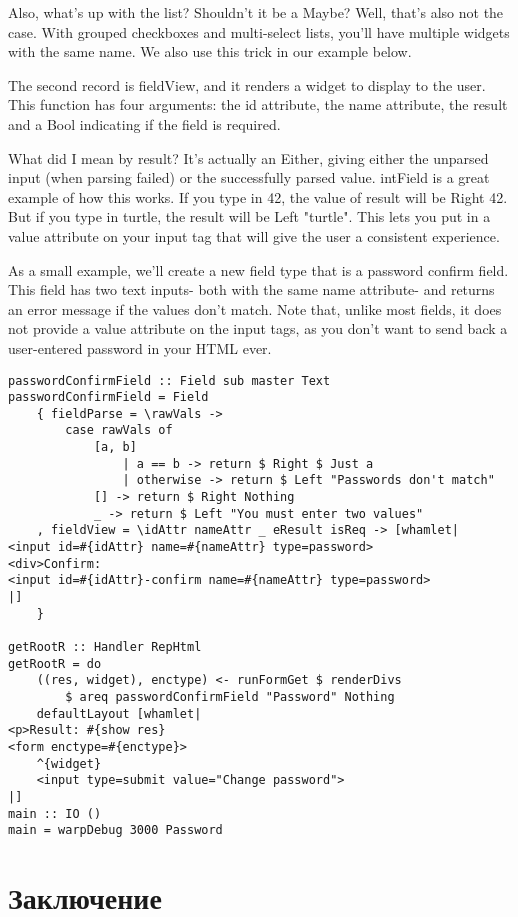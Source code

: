 Also, what's up with the list? Shouldn't it be a Maybe? Well, that's also not the case.
With grouped checkboxes and multi-select lists, you'll have multiple widgets with the same
name. We also use this trick in our example below.

The second record is fieldView, and it renders a widget to display to the user. This
function has four arguments: the id attribute, the name attribute, the result and a Bool
indicating if the field is required.

What did I mean by result? It's actually an Either, giving either the unparsed input (when
parsing failed) or the successfully parsed value. intField is a great example of how this
works. If you type in 42, the value of result will be Right 42. But if you type in turtle,
the result will be Left "turtle". This lets you put in a value attribute on your input tag
that will give the user a consistent experience.

As a small example, we'll create a new field type that is a password confirm field. This
field has two text inputs- both with the same name attribute- and returns an error message
if the values don't match. Note that, unlike most fields, it does not provide a value
attribute on the input tags, as you don't want to send back a user-entered password in
your HTML ever.

\begin{lstlisting}
passwordConfirmField :: Field sub master Text
passwordConfirmField = Field
    { fieldParse = \rawVals ->
        case rawVals of
            [a, b]
                | a == b -> return $ Right $ Just a
                | otherwise -> return $ Left "Passwords don't match"
            [] -> return $ Right Nothing
            _ -> return $ Left "You must enter two values"
    , fieldView = \idAttr nameAttr _ eResult isReq -> [whamlet|
<input id=#{idAttr} name=#{nameAttr} type=password>
<div>Confirm:
<input id=#{idAttr}-confirm name=#{nameAttr} type=password>
|]
    }

getRootR :: Handler RepHtml
getRootR = do
    ((res, widget), enctype) <- runFormGet $ renderDivs
        $ areq passwordConfirmField "Password" Nothing
    defaultLayout [whamlet|
<p>Result: #{show res}
<form enctype=#{enctype}>
    ^{widget}
    <input type=submit value="Change password">
|]
main :: IO ()
main = warpDebug 3000 Password
\end{lstlisting}

\section{Заключение}

